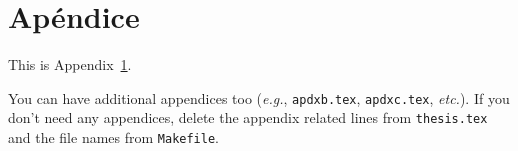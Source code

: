 \chapter{Ap\'{e}ndice}
\label{apdx:somelabel}
This is Appendix~\ref{apdx:somelabel}.

You can have additional appendices too
(\emph{e.g.}, \texttt{apdxb.tex}, \texttt{apdxc.tex}, \emph{etc.}).
If you don't need any appendices, delete the appendix
related lines from \texttt{thesis.tex} and the file names
from \texttt{Makefile}.
